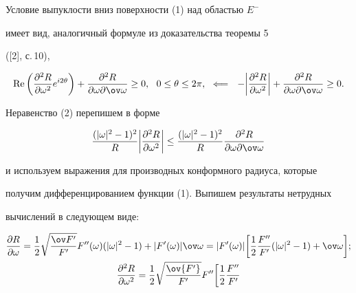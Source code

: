 \begin{pf} 


Условие выпуклости вниз поверхности (1) над областью $E^-$ 


имеет вид, аналогичный формуле из доказательства теоремы 5 


([2], с.\,10), 


\begin{equation} 


\re\bigg(\frac{\partial^2R}{\partial\omega^2}e^{i2\theta} 


\bigg)+\frac{\partial^2R}{\partial\omega\partial\ov\omega}\ge0, 


\ \ 0\le\theta\le2\pi,\ \ \Longleftarrow\ \  


-\bigg|\frac{\partial^2R}{\partial\omega^2}\bigg|+ 


\frac{\partial^2R}{\partial\omega\partial\ov\omega}\ge0. 


\end{equation} 


Неравенство (2) перепишем в форме 


\begin{equation} 


\frac{(|\omega|^2-1)^2}{R}\bigg| 


\frac{\partial^2R}{\partial\omega^2}\bigg|\le 


\frac{(|\omega|^2-1)^2}{R} 


\frac{\partial^2R}{\partial\omega\partial\ov\omega} 


\end{equation} 


и используем выражения для производных конформного радиуса, которые 


получим дифференцированием функции (1). Выпишем результаты нетрудных 


вычислений в следующем виде: 


\begin{gather} 


\frac{\partial R}{\partial\omega}=\frac{1}{2} 


\sqrt{\frac{\ov F{'}}{F'}}F''(\omega)(|\omega|^2-1)+ 


|F'(\omega)|\ov\omega=|F'(\omega)|\bigg[\frac{1}{2} 


\frac{F''}{F'}(|\omega|^2-1)+\ov\omega\bigg];\notag\\ 


% 


\frac{\partial^2R}{\partial\omega^2}=\frac{1}{2} 


\sqrt{\frac{\ov{F'}}{F'}}F''\bigg[\frac{1}{2}\frac{F''}{F'} 



\end{gather}
\end{pf}
